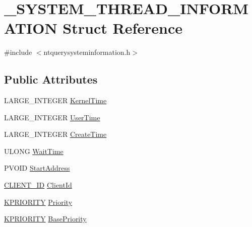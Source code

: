 \section{\-\_\-\-S\-Y\-S\-T\-E\-M\-\_\-\-T\-H\-R\-E\-A\-D\-\_\-\-I\-N\-F\-O\-R\-M\-A\-T\-I\-O\-N Struct Reference}
\label{struct___s_y_s_t_e_m___t_h_r_e_a_d___i_n_f_o_r_m_a_t_i_o_n}


{\ttfamily \#include $<$ntquerysysteminformation.\-h$>$}

\subsection*{Public Attributes}
\begin{DoxyCompactItemize}
\item 
L\-A\-R\-G\-E\-\_\-\-I\-N\-T\-E\-G\-E\-R \hyperlink{struct___s_y_s_t_e_m___t_h_r_e_a_d___i_n_f_o_r_m_a_t_i_o_n_a564e7dd23c63f396218c6e3a0e4eee11}{Kernel\-Time}
\item 
L\-A\-R\-G\-E\-\_\-\-I\-N\-T\-E\-G\-E\-R \hyperlink{struct___s_y_s_t_e_m___t_h_r_e_a_d___i_n_f_o_r_m_a_t_i_o_n_a16710f36176fd24d13291011038d66bf}{User\-Time}
\item 
L\-A\-R\-G\-E\-\_\-\-I\-N\-T\-E\-G\-E\-R \hyperlink{struct___s_y_s_t_e_m___t_h_r_e_a_d___i_n_f_o_r_m_a_t_i_o_n_a4b8b81c13453b26fddba3ce718b682c7}{Create\-Time}
\item 
U\-L\-O\-N\-G \hyperlink{struct___s_y_s_t_e_m___t_h_r_e_a_d___i_n_f_o_r_m_a_t_i_o_n_a4e3fa57cc4de5c02295309a9dfa58d57}{Wait\-Time}
\item 
P\-V\-O\-I\-D \hyperlink{struct___s_y_s_t_e_m___t_h_r_e_a_d___i_n_f_o_r_m_a_t_i_o_n_a9ba14c874f3649b36beb9a4b6543e73b}{Start\-Address}
\item 
\hyperlink{ntdll_8h_a84b8c09135ebbc3f50857e14c3823c39}{C\-L\-I\-E\-N\-T\-\_\-\-I\-D} \hyperlink{struct___s_y_s_t_e_m___t_h_r_e_a_d___i_n_f_o_r_m_a_t_i_o_n_a0663c31299906ea25b84338bb5e1b4b6}{Client\-Id}
\item 
\hyperlink{ntdll_8h_ade7f74903369701780e5940b2d929167}{K\-P\-R\-I\-O\-R\-I\-T\-Y} \hyperlink{struct___s_y_s_t_e_m___t_h_r_e_a_d___i_n_f_o_r_m_a_t_i_o_n_a56653436f96718ecb557cd02a4499678}{Priority}
\item 
\hyperlink{ntdll_8h_ade7f74903369701780e5940b2d929167}{K\-P\-R\-I\-O\-R\-I\-T\-Y} \hyperlink{struct___s_y_s_t_e_m___t_h_r_e_a_d___i_n_f_o_r_m_a_t_i_o_n_afea9439c35b16571774bc02de9961d39}{Base\-Priority}

\end{DoxyCompactItemize}
